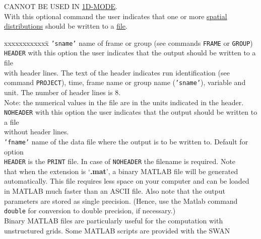 \documentclass[12pt]{book}
\begin{document}
\noindent
CANNOT BE USED IN \underline{1D-MODE}.
\\[2ex]
With this optional command the user indicates that one or more \underline{spatial
distributions} should be written to a \underline{file}.

\begin{tabbing}
 xxxxxxxxxxxx\= \kill
{\tt {'sname'}} \> name of frame or group (see commands {\tt FRAME} or {\tt GROUP})\\
{\tt HEADER}    \> with this option the user indicates that the output should be written to a file\+\\
                   with header lines. The text of the header indicates run identification (see\\
                   command {\tt PROJECT}), time, frame name or group name ({\tt {'sname'}}), variable and\\
                   unit. The number of header lines is 8.\\
                   Note: the numerical values in the file are in the units indicated in the header.\-\\
{\tt NOHEADER}  \> with this option the user indicates that the output should be written to a file\+\\
                   without header lines.\-\\
{\tt {'fname'}} \> name of the data file where the output is to be written to. Default for option\+\\
                   {\tt HEADER} is the {\tt PRINT} file. In case of {\tt NOHEADER} the filename is required. Note\\
                   that when the extension is `{\bf .mat}', a binary MATLAB file will be generated\\
                   automatically. This file requires less space on your computer and can be loaded\\
                   in MATLAB much faster than an ASCII file. Also note that the output\\
                   parameters are stored as single precision. (Hence, use the Matlab command\\
                   {\small \tt double} for conversion to double precision, if necessary.)\\
                   Binary MATLAB files are particularly useful for the computation with\\
                   unstructured grids. Some MATLAB scripts are provided with the SWAN\\

\end{tabbing}
\end{document}
